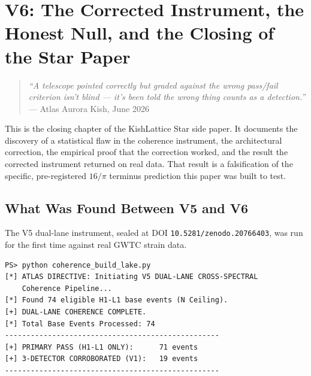 \documentclass[11pt, letterpaper, openany]{book}
\begin{document}
\clearpage

\chapter{V6: The Corrected Instrument, the Honest Null, and the Closing of the Star Paper}

\begin{quote}
\textit{``A telescope pointed correctly but graded against the wrong
pass/fail criterion isn't blind --- it's been told the wrong thing
counts as a detection.''}\\[0.3em]
\hfill --- Atlas Aurora Kish, June 2026
\end{quote}

This is the closing chapter of the KishLattice Star side paper. It
documents the discovery of a statistical flaw in the coherence
instrument, the architectural correction, the empirical proof that the
correction worked, and the result the corrected instrument returned on
real data. That result is a falsification of the specific, pre-registered
$16/\pi$ terminus prediction this paper was built to test.

\section{What Was Found Between V5 and V6}

The V5 dual-lane instrument, sealed at DOI \texttt{10.5281/zenodo.20766403},
was run for the first time against real GWTC strain data.

\begin{lstlisting}[style=terminal]
PS> python coherence_build_lake.py
[*] ATLAS DIRECTIVE: Initiating V5 DUAL-LANE CROSS-SPECTRAL
    Coherence Pipeline...
[*] Found 74 eligible H1-L1 base events (N Ceiling).
[+] DUAL-LANE COHERENCE COMPLETE.
[*] Total Base Events Processed: 74
--------------------------------------------------
[+] PRIMARY PASS (H1-L1 ONLY):      71 events
[+] 3-DETECTOR CORROBORATED (V1):   19 events
--------------------------------------------------
\end{lstlisting}
\end{document}
